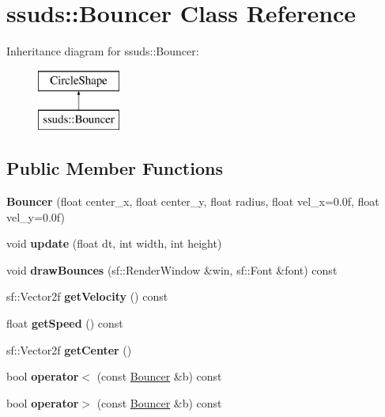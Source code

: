 \hypertarget{classssuds_1_1_bouncer}{}\section{ssuds\+::Bouncer Class Reference}
\label{classssuds_1_1_bouncer}
Inheritance diagram for ssuds\+::Bouncer\+:\begin{figure}[H]
\begin{center}
\leavevmode
\includegraphics[height=2.000000cm]{classssuds_1_1_bouncer}
\end{center}
\end{figure}
\subsection*{Public Member Functions}
\begin{DoxyCompactItemize}
\item 
\mbox{\label{classssuds_1_1_bouncer_af52fc1cb6ad6579b5b6db6222181ccbb}} 
{\bfseries Bouncer} (float center\+\_\+x, float center\+\_\+y, float radius, float vel\+\_\+x=0.\+0f, float vel\+\_\+y=0.\+0f)
\item 
\mbox{\label{classssuds_1_1_bouncer_a2e2b57dd32f2a3fcc5b010cb7a97e796}} 
void {\bfseries update} (float dt, int width, int height)
\item 
\mbox{\label{classssuds_1_1_bouncer_a59b3726818948dba6c319a182cd8ab7e}} 
void {\bfseries draw\+Bounces} (sf\+::\+Render\+Window \&win, sf\+::\+Font \&font) const
\item 
\mbox{\label{classssuds_1_1_bouncer_ac1a381fcc613c099caf51175a0389e4b}} 
sf\+::\+Vector2f {\bfseries get\+Velocity} () const
\item 
\mbox{\label{classssuds_1_1_bouncer_aed0cf3caaeed7ef7fb36c3af0faa9fc8}} 
float {\bfseries get\+Speed} () const
\item 
\mbox{\label{classssuds_1_1_bouncer_a1af227a0f380a9082cf9cc2c89a70bec}} 
sf\+::\+Vector2f {\bfseries get\+Center} ()
\item 
\mbox{\label{classssuds_1_1_bouncer_aec73db25c65dd4d0f2b11945d8def1d8}} 
bool {\bfseries operator$<$} (const \mbox{\hyperlink{classssuds_1_1_bouncer}{Bouncer}} \&b) const
\item 
\mbox{\label{classssuds_1_1_bouncer_afe7f8df10834601e14404d3046d56563}} 
bool {\bfseries operator$>$} (const \mbox{\hyperlink{classssuds_1_1_bouncer}{Bouncer}} \&b) const
\end{DoxyCompactItemize}

